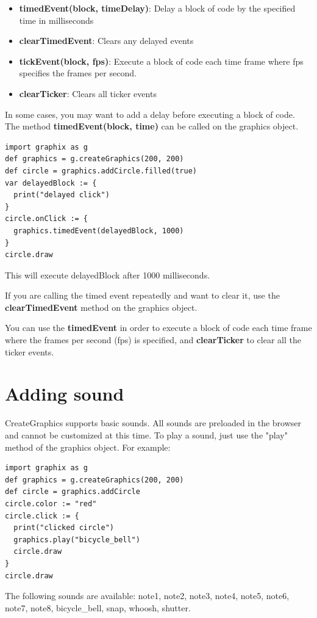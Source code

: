 \documentclass{article}
\begin{document}
\begin{itemize}
\item \textbf{timedEvent(block, timeDelay)}: Delay a block of code by the specified time in milliseconds
\item \textbf{clearTimedEvent}: Clears any delayed events
\item \textbf{tickEvent(block, fps)}: Execute a block of code each time frame where fps specifies the frames per second.
\item \textbf{clearTicker}: Clears all ticker events
\end{itemize}

In some cases, you may want to add a delay before executing a block of code. The
method \textbf{timedEvent(block, time)} can be called on the graphics object.

\begin{lstlisting}
import graphix as g
def graphics = g.createGraphics(200, 200)
def circle = graphics.addCircle.filled(true)
var delayedBlock := {
  print("delayed click")
}
circle.onClick := { 
  graphics.timedEvent(delayedBlock, 1000)
}
circle.draw
\end{lstlisting}
This will execute delayedBlock after 1000 milliseconds.

If you are calling the timed event repeatedly and want to clear it, use the \textbf{clearTimedEvent}
method on the graphics object.

You can use the \textbf{timedEvent} in order to execute a block of code each time frame where the frames per second (fps) is specified, and \textbf{clearTicker} to clear all the ticker events.

\section{Adding sound}
CreateGraphics supports basic sounds. All sounds are preloaded in the browser and cannot be customized at this time.
To play a sound, just use the "play" method of the graphics object. For example:
\begin{lstlisting}
import graphix as g
def graphics = g.createGraphics(200, 200)
def circle = graphics.addCircle
circle.color := "red"
circle.click := { 
  print("clicked circle") 
  graphics.play("bicycle_bell")
  circle.draw
}
circle.draw
\end{lstlisting}


The following sounds are available: note1, note2, note3, note4, note5, note6, note7, note8, bicycle\_bell, snap, 
whoosh, shutter.
\end{document}
